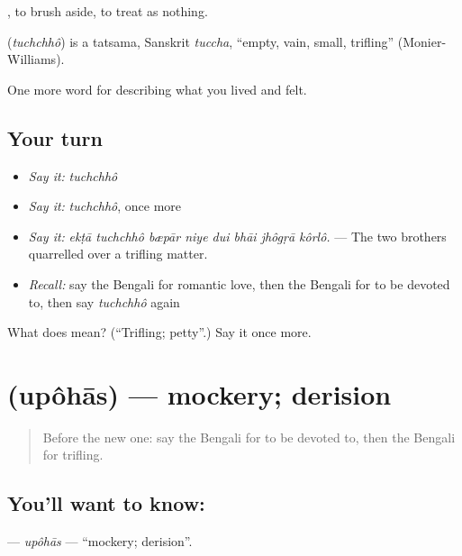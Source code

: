 , to brush aside, to treat as nothing.

\begin{cousinweb}
\textbf{} (\emph{tuchchhô}) is a tatsama, Sanskrit \emph{tuccha}, \textquotedblleft{}empty, vain, small, trifling\textquotedblright{} (Monier-Williams).
\end{cousinweb}

\begin{grammarlens}[title={What you've built}]
One more word for describing what you lived and felt.
\end{grammarlens}

\subsection*{Your turn}
\begin{itemize}
\raggedright
  \item \emph{Say it:} \emph{tuchchhô}
  \item \emph{Say it:} \emph{tuchchhô}, once more
  \item \emph{Say it:} \emph{ekṭā tuchchhô bæpār niye dui bhāi jhôgṛā kôrlô.} — The two brothers quarrelled over a trifling matter.
  \item \emph{Recall:} say the Bengali for romantic love, then the Bengali for to be devoted to, then say \emph{tuchchhô} again
\end{itemize}

\begin{tcolorbox}[breakable,colback=teal!4,colframe=teal!35!black,title={Before you move on}]
What does  mean? (\textquotedblleft{}Trifling; petty\textquotedblright{}.) Say it once more.
\end{tcolorbox}
\section[\texorpdfstring{\bn{উপহাস} (upôhās)}{উপহাস (upôhās)}]{ (upôhās) — mockery; derision}

\label{lesson:BN-C450-upohas}



\begin{quote}
Before the new one: say the Bengali for to be devoted to, then the Bengali for trifling.
\end{quote}

\subsection*{You'll want to know: }
\textbf{} — \emph{upôhās} — \textquotedblleft{}mockery; derision\textquotedblright{}.

